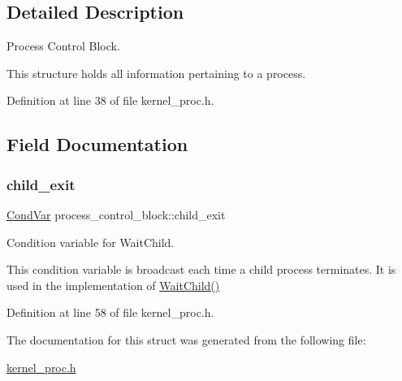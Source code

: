 \subsection{Detailed Description}
Process Control Block. 

This structure holds all information pertaining to a process. 

Definition at line 38 of file kernel\+\_\+proc.\+h.



\subsection{Field Documentation}
\mbox{\label{structprocess__control__block_a6bcb52e96fdf96d060af2b11f07d44bd}} 
\subsubsection{\texorpdfstring{child\+\_\+exit}{child\_exit}}
{\footnotesize\ttfamily \hyperlink{structCondVar}{Cond\+Var} process\+\_\+control\+\_\+block\+::child\+\_\+exit}



Condition variable for {\ttfamily Wait\+Child}. 

This condition variable is broadcast each time a child process terminates. It is used in the implementation of {\ttfamily \hyperlink{group__syscalls_ga37017afba05480740d26b033975fef03}{Wait\+Child()}} 

Definition at line 58 of file kernel\+\_\+proc.\+h.



The documentation for this struct was generated from the following file\+:\begin{DoxyCompactItemize}
\item 
\hyperlink{kernel__proc_8h}{kernel\+\_\+proc.\+h}\end{DoxyCompactItemize}
